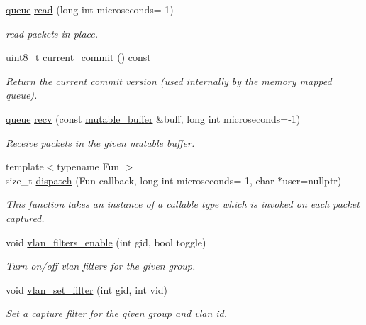 \begin{DoxyCompactItemize}
\hyperlink{classnet_1_1queue}{queue} \hyperlink{classnet_1_1pfq_aa5f1f823256285ebd45d47e454ce7bd4}{read} (long int microseconds=-\/1)
\begin{DoxyCompactList}\small\item\em read packets in place. \end{DoxyCompactList}\item 
uint8\-\_\-t \hyperlink{classnet_1_1pfq_a31aa0b2b6221c4b70ade77ad00e2761b}{current\-\_\-commit} () const 
\begin{DoxyCompactList}\small\item\em Return the current commit version (used internally by the memory mapped queue). \end{DoxyCompactList}\item 
\hyperlink{classnet_1_1queue}{queue} \hyperlink{classnet_1_1pfq_a858804361efdbd149b838940319be49c}{recv} (const \hyperlink{namespacenet_ac0df3fa0efbc044d8a2441906e8f61cb}{mutable\-\_\-buffer} \&buff, long int microseconds=-\/1)
\begin{DoxyCompactList}\small\item\em Receive packets in the given mutable buffer. \end{DoxyCompactList}\item 
{\footnotesize template$<$typename Fun $>$ }\\size\-\_\-t \hyperlink{classnet_1_1pfq_af96974c25658386b3ad994b0de43f4b2}{dispatch} (Fun callback, long int microseconds=-\/1, char $\ast$user=nullptr)
\begin{DoxyCompactList}\small\item\em This function takes an instance of a callable type which is invoked on each packet captured. \end{DoxyCompactList}\item 
void \hyperlink{classnet_1_1pfq_ae70dad67b0f243e604ffc6d94a888454}{vlan\-\_\-filters\-\_\-enable} (int gid, bool toggle)
\begin{DoxyCompactList}\small\item\em Turn on/off vlan filters for the given group. \end{DoxyCompactList}\item 
void \hyperlink{classnet_1_1pfq_ae659846711122122b7a086f70e4b2375}{vlan\-\_\-set\-\_\-filter} (int gid, int vid)
\begin{DoxyCompactList}\small\item\em Set a capture filter for the given group and vlan id. \end{DoxyCompactList}\item 

\end{DoxyCompactItemize}
